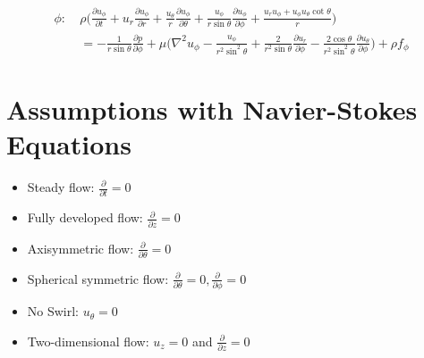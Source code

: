 \documentclass{article}
\begin{document}
\begin{itemize}
            \begin{equation*}
            \begin{split}
            \phi: \ & \rho \bigg(\frac{\partial u_{\phi}}{\partial t} + u_{r} \frac{\partial u_{\phi}}{\partial r} + \frac{u_{\theta}}{r} \frac{\partial u_{\phi}}{\partial \theta} + \frac{u_{\phi}}{r\sin \theta} \frac{\partial u_{\phi}}{\partial \phi} + \frac{u_{r}u_{\phi}+u_{\phi}u_{\theta}\cot\theta}{r} \bigg) \\
            & = -\frac{1}{r\sin\theta}\frac{\partial p}{\partial \phi} + \mu \bigg( \nabla^{2}u_{\phi} - \frac{u_{\phi}}{r^{2}\sin^{2}\theta} + \frac{2}{r^{2}\sin \theta}\frac{\partial u_{r}}{\partial \phi} - \frac{2\cos \theta}{r^{2}\sin^{2}\theta}\frac{\partial u_{\theta}}{\partial \phi} \bigg) + \rho f_{\phi}
            \end{split}  
            \end{equation*}
        \end{itemize}


\section{Assumptions with Navier-Stokes Equations}
\begin{multicols}{2}
\begin{itemize}
    \item Steady flow: $\displaystyle \frac{\partial}{\partial t} = 0$
    \item Fully developed flow: $\displaystyle \frac{\partial}{\partial z} = 0$
    \item Axisymmetric flow: $\displaystyle \frac{\partial}{\partial \theta} = 0$
    \item Spherical symmetric flow: $\displaystyle \frac{\partial}{\partial \theta} = 0, \frac{\partial}{\partial \phi} = 0$
    \item No Swirl: $u_{\theta} = 0$
    \item Two-dimensional flow: $\displaystyle u_{z}=0$ and $\displaystyle \frac{\partial}{\partial z} = 0$
\end{itemize}
\end{multicols}
\end{document}
